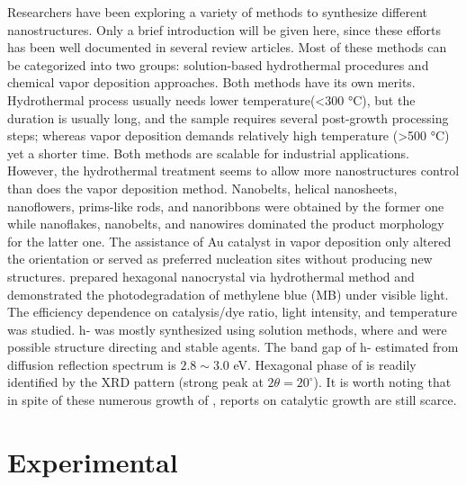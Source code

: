 Researchers have been exploring a variety of methods to synthesize different  nanostructures. Only a brief introduction will be given here, since these efforts has been well documented in several review articles.\cite{He2003} Most of these methods can be categorized into two groups: solution-based hydrothermal procedures \citep{Li2002b,Xia2006,Li2006a,Camacho-Bragado2006} and chemical vapor deposition approaches.\citep{Zeng1998,Li2002c,Li2002d,Zhou2003b,Fibers2007,Yan2009} Both methods have its own merits. Hydrothermal process usually needs lower temperature(\textless 300 \si{\degreeCelsius}), but the duration is usually long, and the sample requires several post-growth processing steps; whereas vapor deposition demands relatively high temperature (\textgreater 500 \si{\degreeCelsius}) yet a shorter time. Both methods are scalable for industrial applications. However, the hydrothermal treatment seems to allow more  nanostructures control than does the vapor deposition method. Nanobelts,\cite{Li2002b} helical nanosheets, nanoflowers, prims-like rods,\cite{Li2006a} and nanoribbons\cite{Camacho-Bragado2006} were obtained by the former one while nanoflakes,\cite{Chen2009} nanobelts,\cite{Hu2009} and nanowires\citep{Zhou2003b,Chen2011b} dominated the product morphology for the latter one. The assistance of Au catalyst in vapor deposition only altered the orientation\cite{Yan2009} or served as preferred nucleation sites\cite{Cai2011} without producing new  structures. \citeauthor{Chithambararaj2013} prepared hexagonal  nanocrystal via hydrothermal method and demonstrated the photodegradation of methylene blue (MB) under visible light.\cite{Chithambararaj2013} The efficiency dependence on catalysis/dye ratio, light intensity, and temperature was studied. h- was mostly synthesized using solution methods, where  and  were possible structure directing and stable agents. The band gap of h- estimated from diffusion reflection spectrum is $2.8\sim3.0$ eV. Hexagonal phase of  is readily identified by the XRD pattern (strong peak at $2\theta=20^{\circ}$). It is worth noting that in spite of these numerous growth of , reports on catalytic growth are still scarce. 

\section{Experimental}\label{sec:grow}

